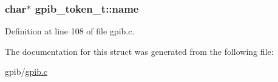 \subsubsection[{\texorpdfstring{name}{name}}]{\setlength{\rightskip}{0pt plus 5cm}char$\ast$ gpib\+\_\+token\+\_\+t\+::name}\hypertarget{structgpib__token__t_aa47fb36b52bd83dc60e67a54f6e36e09}{}\label{structgpib__token__t_aa47fb36b52bd83dc60e67a54f6e36e09}


Definition at line 108 of file gpib.\+c.



The documentation for this struct was generated from the following file\+:\begin{DoxyCompactItemize}
\item 
gpib/\hyperlink{gpib_8c}{gpib.\+c}\end{DoxyCompactItemize}

